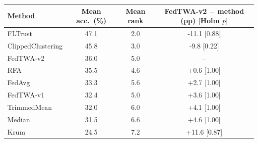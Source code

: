 \begin{tabular}{lccc}
\toprule
Method & Mean acc.\ (\%) & Mean rank & FedTWA-v2 $-$ method (pp) [Holm $p$]\\
\midrule
FLTrust & 47.1 & 2.0 & -11.1 [0.88]\\
ClippedClustering & 45.8 & 3.0 & -9.8 [0.22]\\
FedTWA-v2 & 36.0 & 5.0 & --\\
RFA & 35.5 & 4.6 & +0.6 [1.00]\\
FedAvg & 33.3 & 5.6 & +2.7 [1.00]\\
FedTWA-v1 & 32.4 & 5.0 & +3.6 [1.00]\\
TrimmedMean & 32.0 & 6.0 & +4.1 [1.00]\\
Median & 31.5 & 6.6 & +4.6 [1.00]\\
Krum & 24.5 & 7.2 & +11.6 [0.87]\\
\bottomrule
\end{tabular}
